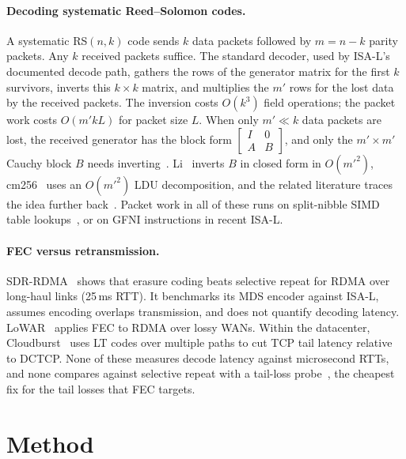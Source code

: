 \documentclass[10pt,twocolumn]{article}
\begin{document}
\paragraph{Decoding systematic Reed--Solomon codes.} A systematic RS$(n,k)$ code sends $k$ data
packets followed by $m=n-k$ parity packets. Any $k$ received packets suffice. The standard decoder,
used by ISA-L's documented decode path, gathers the rows of the generator matrix for the first $k$
survivors, inverts this $k\times k$ matrix, and multiplies the $m'$ rows for the lost data by the
received packets. The inversion costs $O(k^3)$ field operations; the packet work costs
$O(m'kL)$ for packet size $L$. When only $m'\ll k$ data packets are lost, the received generator
has the block form $\left[\begin{smallmatrix}I & 0\\ A & B\end{smallmatrix}\right]$, and only the $m'\times m'$
Cauchy block $B$ needs inverting~\cite{li2005patent,samsung2015cauchy}. Li~\cite{li2005patent}
inverts $B$ in closed form in $O(m'^2)$, cm256~\cite{cm256} uses an $O(m'^2)$ LDU decomposition,
and the related literature traces the idea further back~\cite{versfeld2008,didier2009}. Packet
work in all of these runs on split-nibble SIMD table lookups~\cite{plank2013}, or on GFNI
instructions in recent ISA-L.

\paragraph{FEC versus retransmission.} SDR-RDMA~\cite{sdrrdma} shows that erasure coding beats
selective repeat for RDMA over long-haul links (25\,ms RTT). It benchmarks its MDS encoder against
ISA-L, assumes encoding overlaps transmission, and does not quantify decoding latency.
LoWAR~\cite{lowar} applies FEC to RDMA over lossy WANs. Within the datacenter,
Cloudburst~\cite{cloudburst} uses LT codes over multiple paths to cut TCP tail latency relative to
DCTCP. None of these measures decode latency against microsecond RTTs, and none compares against
selective repeat with a tail-loss probe~\cite{rfc8985}, the cheapest fix for the tail losses that
FEC targets.

\section{Method}
\label{sec:method}
\end{document}
